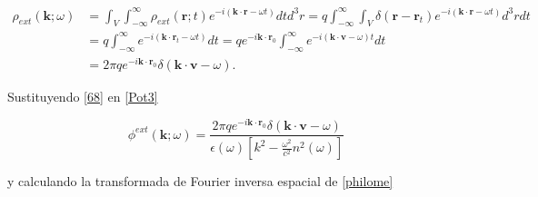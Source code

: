 \documentclass[a4paper,10pt]{article}
\begin{document}
\begin{equation}
\begin{aligned}
\rho_{ext} (\textbf{k};\omega)	&=\int_{V} \int_{-\infty}^{\infty} \rho_{ext} (\textbf{r};t) e^{-i(\textbf{k}\cdot\textbf{r}-\omega t)} dt d^3r
	=q\int_{-\infty}^{\infty} \int_{V}\delta(\textbf{r}-\textbf{r}_t)  e^{-i(\textbf{k}\cdot\textbf{r}-\omega t)} d^3r dt	\\
&=q\int_{-\infty}^{\infty}  e^{-i(\textbf{k}\cdot\textbf{r}_t-\omega t)} dt	
	=	q e^{-i\textbf{k}\cdot\textbf{r}_0}\int_{-\infty}^{\infty}e^{-i(\textbf{k}\cdot\textbf{v}-\omega )t} dt\\
&=2\pi q e^{-i\textbf{k}\cdot\textbf{r}_0}\delta(\textbf{k}\cdot\textbf{v}-\omega).
\end{aligned}
\label{68}
\end{equation}

Sustituyendo \eqref{68} en \eqref{Pot3}

\begin{equation}
\phi^{ext}(\textbf{k};\omega)=\frac{2\pi qe^{-i\textbf{k}\cdot\textbf{r}_0}\delta(\textbf{k}\cdot\textbf{v}-\omega)}{\epsilon(\omega)\left[ k^2-\frac{\omega^2}{c^2}n^2(\omega) \right]}
\label{philome}
\end{equation}

y calculando la transformada de Fourier inversa espacial de \eqref{philome}
\end{document}
